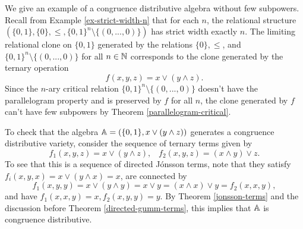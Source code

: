 \documentclass[letterpaper,11pt]{article}
\begin{document}
\begin{ex} We give an example of a congruence distributive algebra without few subpowers. Recall from Example \ref{ex-strict-width-n} that for each $n$, the relational structure $(\{0,1\}, \{0\}, \le, \{0,1\}^n\setminus\{(0,...,0)\})$ has strict width exactly $n$. The limiting relational clone on $\{0,1\}$ generated by the relations $\{0\}, \le$, and $\{0,1\}^n\setminus\{(0,...,0)\}$ for all $n \in \mathbb{N}$ corresponds to the clone generated by the ternary operation
\[
f(x,y,z) = x \vee (y \wedge z).
\]
Since the $n$-ary critical relation $\{0,1\}^n\setminus\{(0,...,0)\}$ doesn't have the parallelogram property and is preserved by $f$ for all $n$, the clone generated by $f$ can't have few subpowers by Theorem \ref{parallelogram-critical}.

To check that the algebra $\mathbb{A} = (\{0,1\}, x \vee (y \wedge z))$ generates a congruence distributive variety, consider the sequence of ternary terms given by
\[
f_1(x,y,z) = x\vee (y\wedge z), \;\;\; f_2(x,y,z) = (x\wedge y) \vee z.
\]
To see that this is a sequence of directed J\'onsson terms, note that they satisfy $f_i(x,y,x) = x \vee (y \wedge x) = x$, are connected by
\[
f_1(x,y,y) = x \vee (y \wedge y) = x \vee y = (x \wedge x) \vee y = f_2(x,x,y),
\]
and have $f_1(x,x,y) = x, f_2(x,y,y) = y$. By Theorem \ref{jonsson-terms} and the discussion before Theorem \ref{directed-gumm-terms}, this implies that $\mathbb{A}$ is congruence distributive.
\end{ex}
\end{document}
